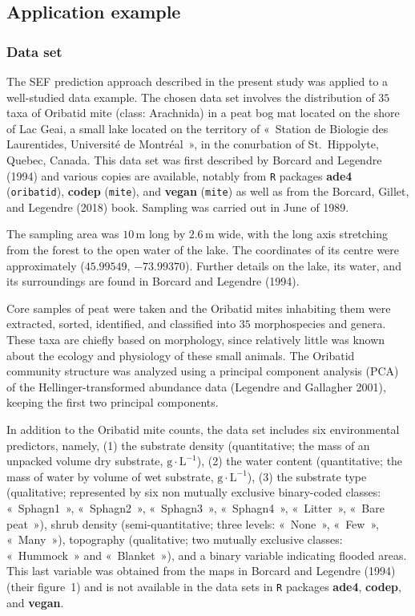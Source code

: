 \documentclass[
]{article}
\begin{document}
\subsection{Application example}\label{application-example}

\subsubsection{Data set}\label{data-set}

The SEF prediction approach described in the present study was applied
to a well-studied data example. The chosen data set involves the
distribution of \(35\) taxa of Oribatid mite (class: Arachnida) in a
peat bog mat located on the shore of Lac Geai, a small lake located on
the territory of «~Station de Biologie des Laurentides, Université de
Montréal~», in the conurbation of St.~Hippolyte, Quebec, Canada. This
data set was first described by Borcard and Legendre (1994) and various
copies are available, notably from \texttt{R} packages \textbf{ade4}
(\texttt{oribatid}), \textbf{codep} (\texttt{mite}), and \textbf{vegan}
(\texttt{mite}) as well as from the Borcard, Gillet, and Legendre (2018)
book. Sampling was carried out in June of 1989.

The sampling area was \(10\,\mathrm{m}\) long by \(2.6\,\mathrm{m}\)
wide, with the long axis stretching from the forest to the open water of
the lake. The coordinates of its centre were approximately
(\(45.99549\), \(-73.99370\)). Further details on the lake, its water,
and its surroundings are found in Borcard and Legendre (1994).

Core samples of peat were taken and the Oribatid mites inhabiting them
were extracted, sorted, identified, and classified into \(35\)
morphospecies and genera. These taxa are chiefly based on morphology,
since relatively little was known about the ecology and physiology of
these small animals. The Oribatid community structure was analyzed using
a principal component analysis (PCA) of the Hellinger-transformed
abundance data (Legendre and Gallagher 2001), keeping the first two
principal components.

In addition to the Oribatid mite counts, the data set includes six
environmental predictors, namely, (1) the substrate density
(quantitative; the mass of an unpacked volume dry substrate,
\(\mathrm{g \cdot L^{-1}}\)), (2) the water content (quantitative; the
mass of water by volume of wet substrate, \(\mathrm{g \cdot L^{-1}}\)),
(3) the substrate type (qualitative; represented by six non mutually
exclusive binary-coded classes: «~Sphagn1~», «~Sphagn2~», «~Sphagn3~»,
«~Sphagn4~», «~Litter~», «~Bare peat~»), shrub density
(semi-quantitative; three levels: «~None~», «~Few~», «~Many~»),
topography (qualitative; two mutually exclusive classes: «~Hummock~» and
«~Blanket~»), and a binary variable indicating flooded areas. This last
variable was obtained from the maps in Borcard and Legendre (1994)
(their figure~1) and is not available in the data sets in \texttt{R}
packages \textbf{ade4}, \textbf{codep}, and \textbf{vegan}.
\end{document}
